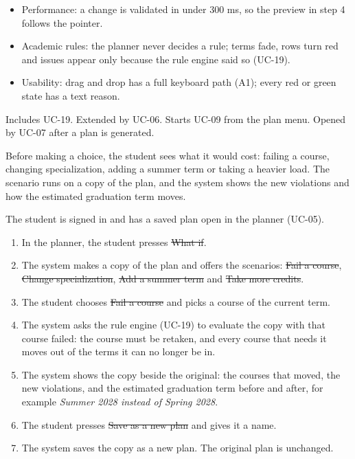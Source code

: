 \begin{itemize}
  \item Performance: a change is validated in under 300 ms, so the preview in step 4 follows the pointer.
  \item Academic rules: the planner never decides a rule; terms fade, rows turn red and issues appear only because the rule
        engine said so (UC-19).
  \item Usability: drag and drop has a full keyboard path (A1); every red or green state has a text reason.
\end{itemize}

Includes UC-19. Extended by UC-06. Starts UC-09 from the plan menu. Opened by UC-07 after a plan is generated.


Before making a choice, the student sees what it would cost: failing a course, changing specialization, adding a summer
term or taking a heavier load. The scenario runs on a copy of the plan, and the system shows the new violations and how the
estimated graduation term moves.

The student is signed in and has a saved plan open in the planner (UC-05).

\begin{enumerate}
  \item In the planner, the student presses \st{What if}.
  \item The system makes a copy of the plan and offers the scenarios: \st{Fail a course}, \st{Change specialization},
        \st{Add a summer term} and \st{Take more credits}.
  \item The student chooses \st{Fail a course} and picks a course of the current term.
  \item The system asks the rule engine (UC-19) to evaluate the copy with that course failed: the course must be retaken,
        and every course that needs it moves out of the terms it can no longer be in.
  \item The system shows the copy beside the original: the courses that moved, the new violations, and the estimated
        graduation term before and after, for example \emph{Summer 2028 instead of Spring 2028}.
  \item The student presses \st{Save as a new plan} and gives it a name.
  \item The system saves the copy as a new plan. The original plan is unchanged.
\end{enumerate}

